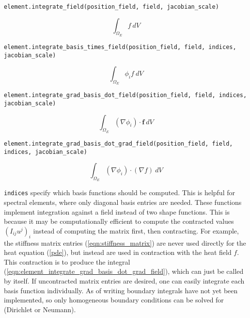 \begin{verbatim}
element.integrate_field(position_field, field, jacobian_scale)
\end{verbatim}

\begin{equation}
\int_{\Omega_E} f~dV
\label{eqn:element_integrate_field}
\end{equation}

\begin{verbatim}
element.integrate_basis_times_field(position_field, field, indices, jacobian_scale)
\end{verbatim}

\begin{equation}
\int_{\Omega_E} \phi_i f~dV
\label{eqn:element_integrate_basis_times_field}
\end{equation}

\begin{verbatim}
element.integrate_grad_basis_dot_field(position_field, field, indices, jacobian_scale)
\end{verbatim}

\begin{equation}
\int_{\Omega_E} (\nabla \phi_i)\cdot \mathbf{f}~dV
\label{eqn:element_integrate_grad_basis_dot_field}
\end{equation}

\begin{verbatim}
element.integrate_grad_basis_dot_grad_field(position_field, field, indices, jacobian_scale)
\end{verbatim}

\begin{equation}
\int_{\Omega_E} (\nabla \phi_i)\cdot (\nabla f)~dV
\label{eqn:element_integrate_grad_basis_dot_grad_field}
\end{equation}

\verb+indices+ specify which basis functions should be computed. This is helpful for spectral elements, where only diagonal basis entries are needed. These functions implement integration against a field instead of two shape functions. This is because it may be computationally efficient to compute the contracted values $(I_{ij}u^j)_i$ instead of computing the matrix first, then contracting. For example, the stiffness matrix entries (\ref{eqn:stiffness_matrix}) are never used directly for the heat equation (\ref{pde}), but instead are used in contraction with the heat field $f$. This contraction is to produce the integral (\ref{eqn:element_integrate_grad_basis_dot_grad_field}), which can just be called by itself. If uncontracted matrix entries are desired, one can easily integrate each basis function individually. As of writing boundary integrals have not yet been implemented, so only homogeneous boundary conditions can be solved for (Dirichlet or Neumann).

